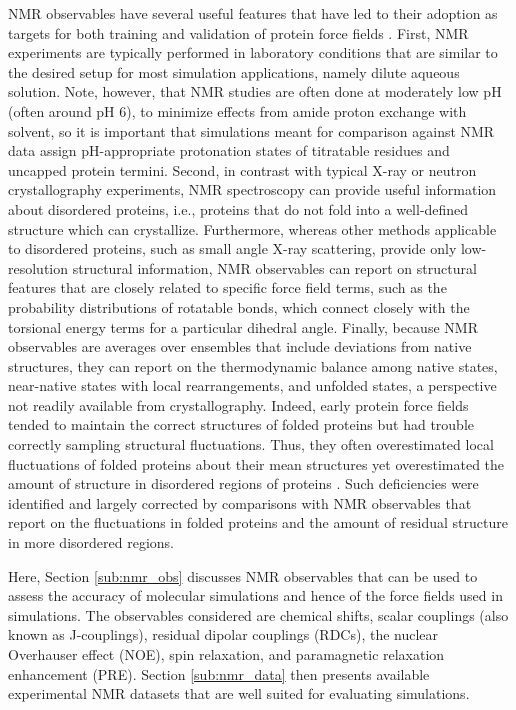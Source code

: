 \documentclass[9pt,review]{livecoms}
\begin{document}
NMR observables have several useful features that have led to their adoption as targets for both training and validation of protein force fields \cite{allison_assessing_2012}.
First, NMR experiments are typically performed in laboratory conditions that are similar to the desired setup for most simulation applications, namely dilute aqueous solution.
Note, however, that NMR studies are often done at moderately low pH (often around pH 6), to minimize effects from amide proton exchange with solvent, so it is important that simulations meant for comparison against NMR data assign pH-appropriate protonation states of titratable residues and uncapped protein termini.
Second, in contrast with typical X-ray or neutron crystallography experiments, NMR spectroscopy can provide useful information about disordered proteins, i.e., proteins that do not fold into a well-defined structure which can crystallize.
Furthermore, whereas other methods applicable to disordered proteins, such as small angle X-ray scattering, provide only low-resolution structural information, NMR observables can report on structural features that are closely related to specific force field terms, such as the probability distributions of rotatable bonds, which connect closely with the torsional energy terms for a particular dihedral angle.
Finally, because NMR observables are averages over ensembles that include deviations from native structures, they can report on the thermodynamic balance among native states, near-native states with local rearrangements, and unfolded states, a perspective not readily available from crystallography.
Indeed, early protein force fields tended to maintain the correct structures of folded proteins but had trouble correctly sampling structural fluctuations.
Thus, they often overestimated local fluctuations of folded proteins about their mean structures yet overestimated the amount of structure in  disordered regions of proteins \cite{mackerell_jr_extending_2004,Hornak:2006:Proteins,lindorff-larsen_improved_2010,best_optimization_2012,Maier:2015:J.Chem.TheoryComput.,diem_hamiltonian_2020}.
Such deficiencies were identified and largely corrected by comparisons with NMR observables that report on the fluctuations in folded proteins and the amount of residual structure in more disordered regions.

Here, Section \ref{sub:nmr_obs} discusses NMR observables that can be used to assess the accuracy of molecular simulations and hence of the force fields used in simulations.
The observables considered are chemical shifts, scalar couplings (also known as J-couplings), residual dipolar couplings (RDCs), the nuclear Overhauser effect (NOE), spin relaxation, and paramagnetic relaxation enhancement (PRE).
Section \ref{sub:nmr_data} then presents available experimental NMR datasets that are well suited for evaluating simulations.
\end{document}
